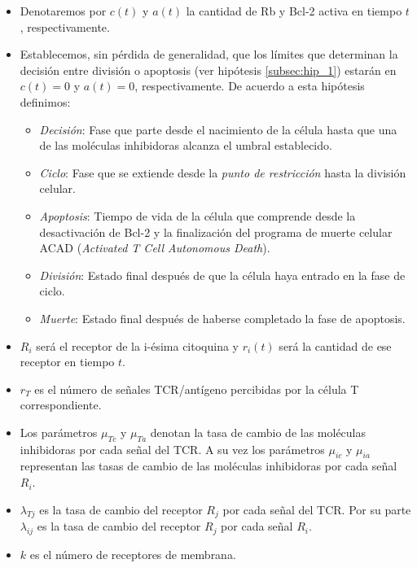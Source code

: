 \begin{itemize}
	\item Denotaremos por \textit{$c(t)$} y \textit{$a(t)$} la cantidad de Rb y Bcl-2 activa en tiempo $t$, respectivamente.

	\item Establecemos, sin pérdida de generalidad, que los límites que determinan la decisión entre división o apoptosis (ver hipótesis \ref{subsec:hip_1}) estarán en $c(t)=0$ y $a(t)=0$, respectivamente. De acuerdo a esta hipótesis definimos: 
	
	\begin{itemize}
		\item \textit{Decisión}: Fase que parte desde el nacimiento de la célula hasta que una de las moléculas inhibidoras alcanza el umbral establecido.
		
		\item \textit{Ciclo}: Fase que se extiende desde la \textit{punto de restricción} hasta la división celular.
		
		\item \textit{Apoptosis}: Tiempo de vida de la célula que comprende desde la desactivación de Bcl-2 y la finalización del programa de muerte celular ACAD (\textit{Activated T Cell Autonomous Death}).
		
		\item \textit{División}: Estado final después de que la célula haya entrado en la fase de ciclo.
		
		\item \textit{Muerte}: Estado final después de haberse completado la fase de apoptosis.
	\end{itemize}

	\item \textit{$R_{i}$} será el receptor de la i-ésima citoquina y \textit{$r_{i}(t)$} será la cantidad de ese receptor en tiempo $t$. 
	\item $r_{T}$ es el número de señales TCR/antígeno percibidas por la célula T correspondiente.
	
	\item Los parámetros $\mu_{Tc}$ y $\mu_{Ta}$ denotan la tasa de cambio de las moléculas inhibidoras por cada señal del TCR. A su vez los parámetros $\mu_{ic}$ y $\mu_{ia}$ representan las tasas de cambio de las moléculas inhibidoras por cada señal $R_i$.
	
	\item $\lambda_{Tj}$ es la tasa de cambio del receptor $R_{j}$ por cada señal del TCR. Por su parte $\lambda_{ij}$ es la tasa de cambio del receptor $R_j$ por cada señal $R_i$.
	
	\item $k$ es el número de receptores de membrana.
\end{itemize} 


